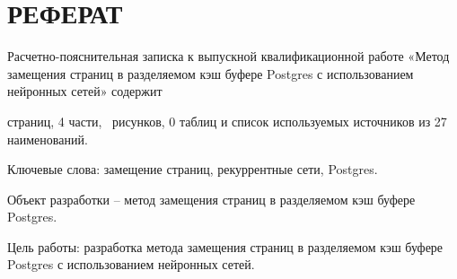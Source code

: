\setcounter{page}{5}

\chapter*{РЕФЕРАТ}







Расчетно-пояснительная записка к выпускной квалификационной работе «Метод замещения страниц в разделяемом кэш буфере Postgres с использованием нейронных сетей» содержит \begin{NoHyper}\pageref{LastPage}\end{NoHyper} страниц, 4 части, \totfig~рисунков, 0 таблиц и список используемых источников из 27 наименований.

Ключевые слова: замещение страниц, рекуррентные сети, Postgres.
	
Объект разработки -- метод замещения страниц в разделяемом кэш буфере Postgres.

Цель работы: разработка метода замещения страниц в разделяемом кэш буфере Postgres с использованием нейронных сетей. 

